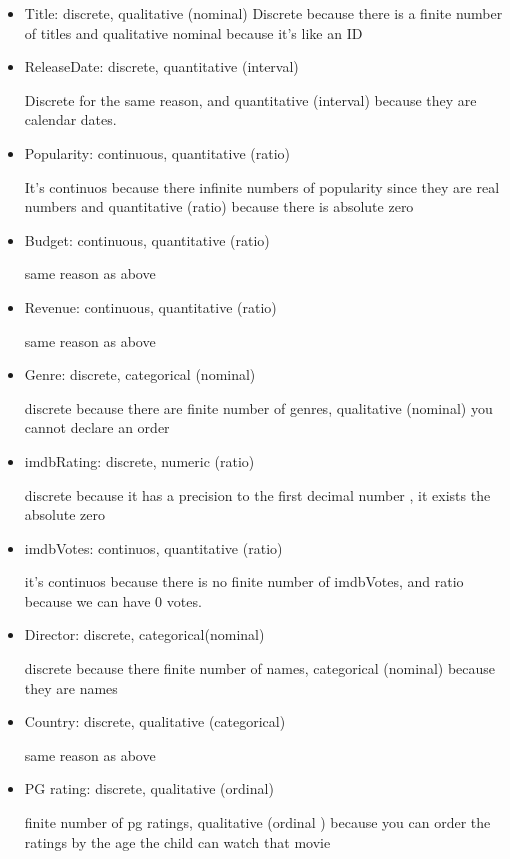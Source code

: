\documentclass[a4paper]{article}
\begin{document}
	\begin{itemize}
		\item Title: discrete, qualitative (nominal)
		Discrete because there is a finite number of titles and qualitative nominal because it's like an ID
		
		\item ReleaseDate: discrete, quantitative (interval)
		
		Discrete for the same reason, and quantitative (interval) because they are calendar dates.
		
		\item Popularity: continuous, quantitative (ratio)
		
		It's continuos because there infinite numbers of popularity since they are real numbers and quantitative (ratio) because there is absolute zero
		
		\item Budget: continuous, quantitative (ratio)
		
		same reason as above
		
		\item Revenue: continuous, quantitative (ratio)
		
		same reason as above
		
		\item Genre: discrete, categorical (nominal)
		
		discrete because there are finite number of genres, qualitative (nominal) you cannot declare an order
		
		\item imdbRating: discrete, numeric (ratio)
		
		discrete because it has a precision to the first decimal number , it exists the absolute zero
		
		\item imdbVotes: continuos, quantitative (ratio)
		
		it's continuos because there is no finite number of imdbVotes, and ratio because we can have 0 votes.
		 
		\item Director: discrete, categorical(nominal)
		
		discrete because there finite number of names, categorical (nominal) because they are names 
		 
		\item Country: discrete, qualitative (categorical)
			
		 same reason as above
		 
		\item PG rating: discrete, qualitative (ordinal)
		
		finite number of pg ratings, qualitative (ordinal ) because you can order the ratings by the age the child can watch that movie
		
	\end{itemize}
\end{document}
